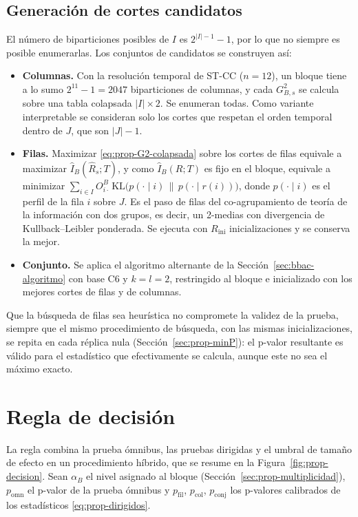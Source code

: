 \subsection{Generación de cortes candidatos}\label{sec:prop-candidatos}

El número de biparticiones posibles de $I$ es $2^{|I|-1}-1$, por lo que no
siempre es posible enumerarlas. Los conjuntos de candidatos se construyen así:

\begin{itemize}
  \item \textbf{Columnas.} Con la resolución temporal de ST-CC ($n=12$), un
  bloque tiene a lo sumo $2^{11}-1 = 2047$ biparticiones de columnas, y cada
  $G^2_{B,s}$ se calcula sobre una tabla colapsada $|I|\times 2$. Se enumeran
  todas. Como variante interpretable se consideran solo los cortes que
  respetan el orden temporal dentro de $J$, que son $|J|-1$.
  \item \textbf{Filas.} Maximizar \eqref{eq:prop-G2-colapsada} sobre los
  cortes de filas equivale a maximizar $\hat I_B(\hat R_s;T)$, y como
  $\hat I_B(R;T)$ es fijo en el bloque, equivale a minimizar
  $\sum_{i\in I} O^B_{i\cdot}\,\mathrm{KL}\bigl(p(\cdot\mid i)\,\|\,p(\cdot\mid r(i))\bigr)$,
  donde $p(\cdot\mid i)$ es el perfil de la fila $i$ sobre $J$. Es el paso de
  filas del co-agrupamiento de teoría de la información \cite{Dhillon2003}
  con dos grupos, es decir, un 2-medias con divergencia de
  Kullback--Leibler ponderada. Se ejecuta con $R_{\mathrm{ini}}$
  inicializaciones y se conserva la mejor.
  \item \textbf{Conjunto.} Se aplica el algoritmo alternante de la
  Sección~\ref{sec:bbac-algoritmo} con base C6 y $k=l=2$, restringido al
  bloque e inicializado con los mejores cortes de filas y de columnas.
\end{itemize}

Que la búsqueda de filas sea heurística no compromete la validez de la prueba,
siempre que el mismo procedimiento de búsqueda, con las mismas
inicializaciones, se repita en cada réplica nula
(Sección~\ref{sec:prop-minP}): el p-valor resultante es válido para el
estadístico que efectivamente se calcula, aunque este no sea el máximo exacto.

\section{Regla de decisión}\label{sec:prop-decision}

La regla combina la prueba ómnibus, las pruebas dirigidas y el umbral de tamaño
de efecto en un procedimiento híbrido, que se resume en la
Figura~\ref{fig:prop-decision}. Sean $\alpha_B$ el nivel asignado al bloque
(Sección~\ref{sec:prop-multiplicidad}), $p_{\mathrm{omn}}$ el p-valor de la
prueba ómnibus y $p_{\mathrm{fil}}$, $p_{\mathrm{col}}$, $p_{\mathrm{conj}}$ los
p-valores calibrados de los estadísticos \eqref{eq:prop-dirigidos}.


